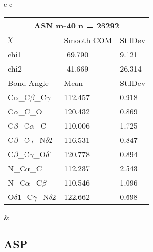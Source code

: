 \begin{longtable}{ c c }
  \begin{tabular}{ l l l }
  \toprule
  \multicolumn{3}{c}{ASN \textbf{m-40} n = 26292} \\ \toprule
  $\chi$       & Smooth COM & StdDev \\ \midrule
  chi1 & -69.790 & 9.121 \\ 
  chi2 & -41.669 & 26.314 \\ \midrule
  Bond Angle   & Mean     & StdDev \\ \midrule
  C$\alpha$\_C$\beta$\_C$\gamma$ & 112.457 & 0.918\\
  C$\alpha$\_C\_O & 120.432 & 0.869\\
  C$\beta$\_C$\alpha$\_C & 110.006 & 1.725\\
  C$\beta$\_C$\gamma$\_N$\delta$2 & 116.531 & 0.847\\
  C$\beta$\_C$\gamma$\_O$\delta$1 & 120.778 & 0.894\\
  N\_C$\alpha$\_C & 112.237 & 2.543\\
  N\_C$\alpha$\_C$\beta$ & 110.546 & 1.096\\
  O$\delta$1\_C$\gamma$\_N$\delta$2 & 122.662 & 0.698\\
  \bottomrule
  \end{tabular}
  &
  \\
  
\end{longtable}    

\newpage
\subsection{ASP}

